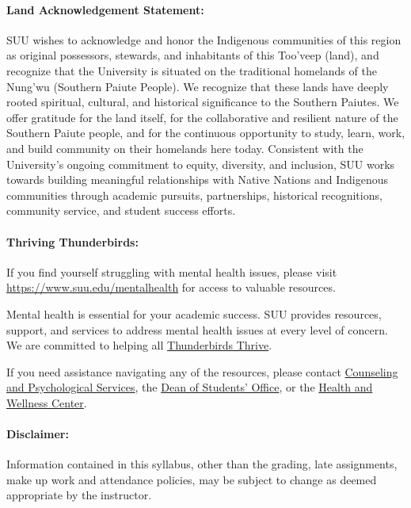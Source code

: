\documentclass[12pt, letterpaper]{article}
\begin{document}
\paragraph{Land Acknowledgement Statement:}
SUU wishes to acknowledge and honor the Indigenous communities of this region as original possessors, stewards, and inhabitants of this Too’veep (land), and recognize that the University is situated on the traditional homelands of the Nung’wu (Southern Paiute People). We recognize that these lands have deeply rooted spiritual, cultural, and historical significance to the Southern Paiutes. We offer gratitude for the land itself, for the collaborative and resilient nature of the Southern Paiute people, and for the continuous opportunity to study, learn, work, and build community on their homelands here today. Consistent with the University's ongoing commitment to equity, diversity, and inclusion, SUU works towards building meaningful relationships with Native Nations and Indigenous communities through academic pursuits, partnerships, historical recognitions, community service, and student success efforts.

\paragraph{Thriving Thunderbirds:}
If you find yourself struggling with mental health issues, please visit \href{https://www.suu.edu/mentalhealth}{https://www.suu.edu/mentalhealth} for access to valuable resources. 

\noindent
Mental health is essential for your academic success. SUU provides resources, support, and services to address mental health issues at every level of concern. We are committed to helping all \href{https://www.suu.edu/mentalhealth/}{Thunderbirds Thrive}. 

\noindent
If you need assistance navigating any of the resources, please contact \href{https://www.suu.edu/caps/}{Counseling and Psychological Services}, the \href{https://www.suu.edu/deanofstudents/}{Dean of Students’ Office}, or the \href{https://www.suu.edu/health/}{Health and Wellness Center}.


\paragraph{Disclaimer:}
Information contained in this syllabus, other than the grading, late assignments, make up work and attendance policies, may be subject to change as deemed appropriate by the instructor.
\end{document}
